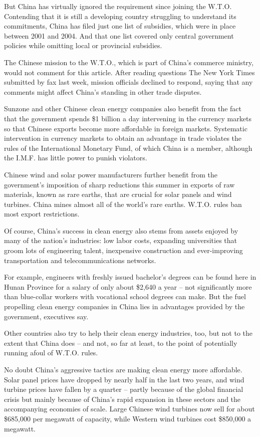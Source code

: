 ﻿\documentclass[12pt]{article}
\begin{document}
But China has virtually ignored the requirement since joining the W.T.O. Contending that it is still
a developing country struggling to understand its commitments, China has filed just one list of
subsidies, which were in place between 2001 and 2004. And that one list covered only central
government policies while omitting local or provincial subsidies.

The Chinese mission to the W.T.O., which is part of China's commerce ministry, would not comment for
this article. After reading questions The New York Times submitted by fax last week, mission
officials declined to respond, saying that any comments might affect China's standing in other trade
disputes.

Sunzone and other Chinese clean energy companies also benefit from the fact that the government
spends \$1 billion a day intervening in the currency markets so that Chinese exports become more
affordable in foreign markets. Systematic intervention in currency markets to obtain an advantage in
trade violates the rules of the International Monetary Fund, of which China is a member, although
the I.M.F. has little power to punish violators.

Chinese wind and solar power manufacturers further benefit from the government's imposition of sharp
reductions this summer in exports of raw materials, known as rare earths, that are crucial for solar
panels and wind turbines. China mines almost all of the world's rare earths. W.T.O. rules ban most
export restrictions.

Of course, China's success in clean energy also stems from assets enjoyed by many of the nation's
industries: low labor costs, expanding universities that groom lots of engineering talent,
inexpensive construction and ever-improving transportation and telecommunications networks.

For example, engineers with freshly issued bachelor's degrees can be found here in Hunan Province
for a salary of only about \$2,640 a year -- not significantly more than blue-collar workers with
vocational school degrees can make. But the fuel propelling clean energy companies in China lies in
advantages provided by the government, executives say.

Other countries also try to help their clean energy industries, too, but not to the extent that
China does -- and not, so far at least, to the point of potentially running afoul of W.T.O. rules.

No doubt China's aggressive tactics are making clean energy more affordable. Solar panel prices have
dropped by nearly half in the last two years, and wind turbine prices have fallen by a quarter --
partly because of the global financial crisis but mainly because of China's rapid expansion in these
sectors and the accompanying economies of scale. Large Chinese wind turbines now sell for about
\$685,000 per megawatt of capacity, while Western wind turbines cost \$850,000 a megawatt.
\end{document}
